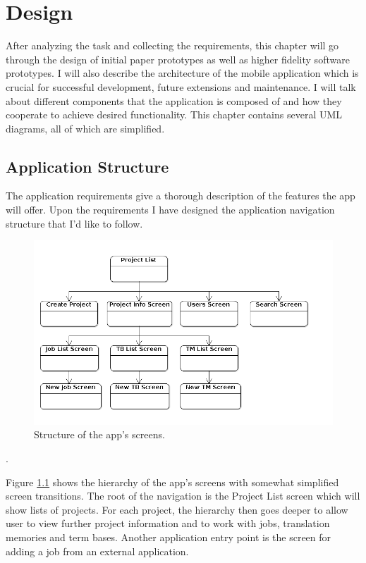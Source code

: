 
\chapter{Design}

After analyzing the task and collecting the requirements, this chapter will go through the design of initial paper prototypes as well as higher fidelity software prototypes. I will also describe the architecture of the mobile application which is crucial for successful development, future extensions and maintenance. I will talk about different components that the application is composed of and how they cooperate to achieve desired functionality. This chapter contains several UML diagrams, all of which are simplified.

\section{Application Structure}

The application requirements give a thorough description of the features the app will offer. Upon the requirements I have designed the application navigation structure that I'd like to follow.


\begin{figure}[H]
	\includegraphics[width=1\textwidth]{argoUml/structure}
	\caption{Structure of the app's screens.}
	\label{fig:structure}
\end{figure}.

Figure \ref{fig:structure} shows the hierarchy of the app's screens with somewhat simplified screen transitions. The root of the navigation is the Project List screen which will show lists of projects. For each project, the hierarchy then goes deeper to allow user to view further project information and to work with jobs, translation memories and term bases. Another application entry point is the screen for adding a job from an external application.

